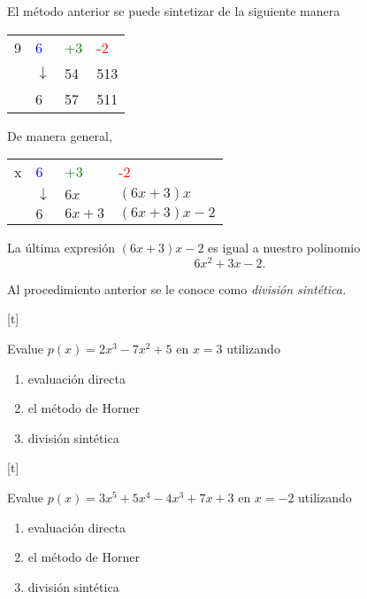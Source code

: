 	El m\'etodo anterior se puede sintetizar de la siguiente manera
	\begin{center}
		\begin{tabular}{l|lll}
			9 & \textcolor{blue}{6} & \textcolor{green}{+3} & \textcolor{red}{-2}\\
			& $\downarrow$ & 54 & 513\\\hline
			& 6 & 57 & 511
		\end{tabular}
	\end{center}
	



	De manera general, 
	\begin{center}
		\begin{tabular}{l|lll}
			x & \textcolor{blue}{6} & \textcolor{green}{+3} & \textcolor{red}{-2}\\
			& $\downarrow$ & $6x$ & $(6x+3)x$\\\hline
			& $6$ & $6x+3$ & $\left( 6x+3 \right)x-2$
		\end{tabular}
	\end{center}
	



	\begin{rem}
		La última expresi\'on $\left( 6x+3 \right)x-2$ es igual a nuestro polinomio
		$$
		6x^{2}+3x-2.
		$$
		
		
		
		Al procedimiento anterior se le conoce como \emph{divisi\'on sint\'etica.}
	\end{rem}
	


[t]
	\begin{problema}
		Evalue $p(x)=2x^{3}-7x^{2}+5$ en $x=3$ utilizando
		\begin{enumerate}
			\item evaluaci\'on directa 
			\item el m\'etodo de Horner 
			\item divisi\'on sint\'etica
		\end{enumerate}
		
		
	\end{problema}
	


[t]
	\begin{problema}
		Evalue $p(x)=3x^{5}+5x^{4}-4x^{3}+7x+3$ en $x=-2$ utilizando
		\begin{enumerate}
			\item evaluaci\'on directa 
			\item el m\'etodo de Horner 
			\item divisi\'on sint\'etica
		\end{enumerate} 
	\end{problema}



